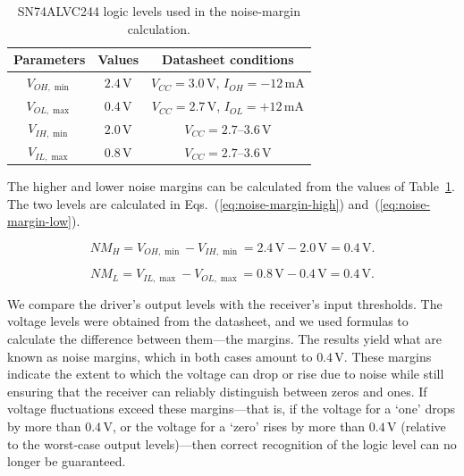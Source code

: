 \begin{table}[h]
    \centering
    \begin{tabular}{ccc}
         \hline
         Parameters & Values & Datasheet conditions\\
         \hline
         $V_{OH,\min}$ & $2.4\,\mathrm{V}$ & $V_{CC}=3.0\,\mathrm{V}$, $I_{OH}=-12\,\mathrm{mA}$ \\
         $V_{OL,\max}$ & $0.4\,\mathrm{V}$ & $V_{CC}=2.7\,\mathrm{V}$, $I_{OL}=+12\,\mathrm{mA}$ \\
         $V_{IH,\min}$ & $2.0\,\mathrm{V}$ & $V_{CC}=2.7$--$3.6\,\mathrm{V}$ \\
         $V_{IL,\max}$ & $0.8\,\mathrm{V}$ & $V_{CC}=2.7$--$3.6\,\mathrm{V}$ \\
         \hline
    \end{tabular}
    \caption{SN74ALVC244 logic levels used in the noise-margin calculation.}
    \label{tab:logic-levels}
\end{table}

The higher and lower noise margins can be calculated from the values of Table~\ref{tab:logic-levels}. The two levels are calculated in Eqs.~(\ref{eq:noise-margin-high}) and~(\ref{eq:noise-margin-low}).

\begin{equation}
NM_H=V_{OH,\min}-V_{IH,\min}=2.4\,\mathrm{V}-2.0\,\mathrm{V}=0.4\,\mathrm{V}.
\label{eq:noise-margin-high}
\end{equation}

\begin{equation}
NM_L=V_{IL,\max}-V_{OL,\max}=0.8\,\mathrm{V}-0.4\,\mathrm{V}=0.4\,\mathrm{V}.
\label{eq:noise-margin-low}
\end{equation}

We compare the driver's output levels with the receiver's input thresholds. The voltage levels were obtained from the datasheet, and we used formulas to calculate the difference between them---the margins. The results yield what are known as noise margins, which in both cases amount to $0.4\,\mathrm{V}$. These margins indicate the extent to which the voltage can drop or rise due to noise while still ensuring that the receiver can reliably distinguish between zeros and ones. If voltage fluctuations exceed these margins---that is, if the voltage for a `one' drops by more than $0.4\,\mathrm{V}$, or the voltage for a `zero' rises by more than $0.4\,\mathrm{V}$ (relative to the worst-case output levels)---then correct recognition of the logic level can no longer be guaranteed.




